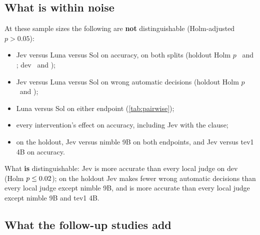\subsection{What is within noise}

At these sample sizes the following are \textbf{not} distinguishable (Holm-adjusted $p > 0.05$):
\begin{itemize}
  \item Jev versus Luna versus Sol on accuracy, on both splits (holdout Holm $p$ \LunaHoldRAccPHolm\ and
    \SolHoldRAccPHolm; dev \LunaDevRAccPHolm\ and \SolDevRAccPHolm);
  \item Jev versus Luna versus Sol on wrong automatic decisions (holdout Holm $p$ \LunaHoldRWaPHolm\ and
    \SolHoldRWaPHolm);
  \item Luna versus Sol on either endpoint (\cref{tab:pairwise});
  \item every intervention's effect on accuracy, including Jev with the clause;
  \item on the holdout, Jev versus nimble 9B on both endpoints, and Jev versus tev1 4B on accuracy.
\end{itemize}
What \textbf{is} distinguishable: Jev is more accurate than every local judge on dev (Holm $p \le
0.02$); on the holdout Jev makes fewer wrong automatic decisions than every local judge
except nimble 9B, and is more accurate than every local judge except nimble 9B and tev1 4B.

\subsection{What the follow-up studies add}\label{sec:recs-followup}

